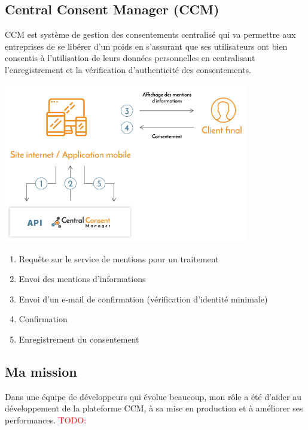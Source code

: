 \documentclass[12pt, a4paper]{report}
\makeatletter
\newcommand\tab[1][1cm]{\hspace*{#1}}
\newcommand\TODO[1]{\textcolor{red}{TODO\@: #1}}
\makeatother
\begin{document}
            \subsection{Central Consent Manager (CCM)}
                \tab{} CCM est système de gestion des consentements centralisé qui va permettre aux entreprises de se libérer d'un poids en s'assurant que ses utilisateurs ont bien consentis à l'utilisation de leurs données personnelles en centralisant l'enregistrement et la vérification d'authenticité des consentements.\newline
                \begin{center}
                    \includegraphics[width=0.8\textwidth]{ccm.png}
                \end{center}
                \begin{enumerate}
                    \item Requête sur le service de mentions pour un traitement
                    \item Envoi des mentions d'informations
                    \item Envoi d'un e-mail de confirmation (vérification d'identité minimale)
                    \item Confirmation
                    \item Enregistrement du consentement
                \end{enumerate}
            \subsection{Ma mission}
                \tab{} Dans une équipe de développeurs qui évolue beaucoup, mon rôle a été d'aider au développement de la plateforme CCM, à sa mise en production et à améliorer ses performances.\newline
                \TODO{}
\end{document}
